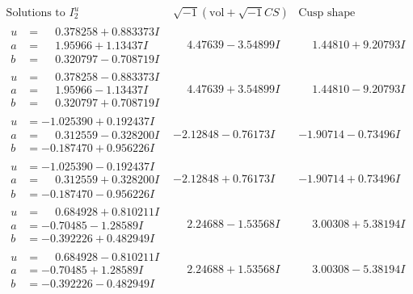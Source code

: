 \documentclass[1p]{elsarticle_modified}
\theoremstyle{definition}
\newcommand{\I}{\sqrt{-1}}
\begin{document}
$$\begin{array}{c|c|c}  
\text{Solutions to }I^u_{2}& \I (\text{vol} + \sqrt{-1}CS) & \text{Cusp shape}\\
 \hline 
\begin{aligned}
u &= \phantom{-}0.378258 + 0.883373 I \\
a &= \phantom{-}1.95966 + 1.13437 I \\
b &= \phantom{-}0.320797 - 0.708719 I\end{aligned}
 & \phantom{-}4.47639 - 3.54899 I & \phantom{-}1.44810 + 9.20793 I \\ \hline\begin{aligned}
u &= \phantom{-}0.378258 - 0.883373 I \\
a &= \phantom{-}1.95966 - 1.13437 I \\
b &= \phantom{-}0.320797 + 0.708719 I\end{aligned}
 & \phantom{-}4.47639 + 3.54899 I & \phantom{-}1.44810 - 9.20793 I \\ \hline\begin{aligned}
u &= -1.025390 + 0.192437 I \\
a &= \phantom{-}0.312559 - 0.328200 I \\
b &= -0.187470 + 0.956226 I\end{aligned}
 & -2.12848 - 0.76173 I & -1.90714 - 0.73496 I \\ \hline\begin{aligned}
u &= -1.025390 - 0.192437 I \\
a &= \phantom{-}0.312559 + 0.328200 I \\
b &= -0.187470 - 0.956226 I\end{aligned}
 & -2.12848 + 0.76173 I & -1.90714 + 0.73496 I \\ \hline\begin{aligned}
u &= \phantom{-}0.684928 + 0.810211 I \\
a &= -0.70485 - 1.28589 I \\
b &= -0.392226 + 0.482949 I\end{aligned}
 & \phantom{-}2.24688 - 1.53568 I & \phantom{-}3.00308 + 5.38194 I \\ \hline\begin{aligned}
u &= \phantom{-}0.684928 - 0.810211 I \\
a &= -0.70485 + 1.28589 I \\
b &= -0.392226 - 0.482949 I\end{aligned}
 & \phantom{-}2.24688 + 1.53568 I & \phantom{-}3.00308 - 5.38194 I \\ \hline\begin{aligned}

\end{aligned}
\end{array}$$
\end{document}
